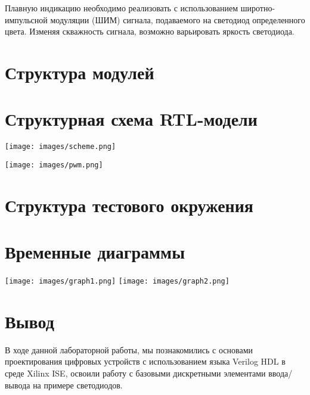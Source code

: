 Плавную индикацию необходимо реализовать с использованием широтно-
импульсной модуляции (ШИМ) сигнала, подаваемого на светодиод определенного
цвета. Изменяя скважность сигнала, возможно варьировать яркость светодиода.

\section{Структура модулей}




\section{Структурная схема RTL-модели}
\centering
\texttt{[image: images/scheme.png]}

\texttt{[image: images/pwm.png]}

\section{Структура тестового окружения}


\section{Временные диаграммы}
\centering
\texttt{[image: images/graph1.png]}
\texttt{[image: images/graph2.png]}

\flushleft
\section{Вывод}
В ходе данной лабораторной работы, мы познакомились с основами проектирования цифровых устройств с использованием языка Verilog HDL в среде Xilinx ISE,
освоили работу с базовыми дискретными элементами ввода/вывода на примере светодиодов.

